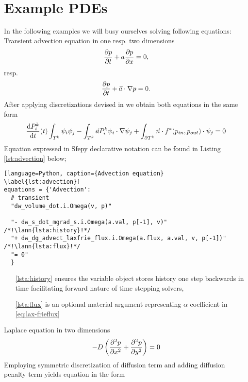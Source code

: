 \section{Example PDEs}
In the following examples we will busy ourselves solving following equations:\\
Transient advection equation in one resp. two dimensions
\begin{equation}
	\label{eq:ex_advection}
	\frac{\partial p}{\partial t} + a\frac{\partial p}{\partial x} = 0,
\end{equation}
resp.
\begin{equation}
	\frac{\partial p}{\partial t} + \vec{a}\cdot\nabla{p} = 0.
\end{equation}
After applying discretizations devised in  we obtain both equations in 
the same form
\begin{equation}
		 \frac{\text{d}P^k_i}{\text{d}t}(t)\int_{T^k}\psi_i\psi_j 
		 - \int_{T^k} \vec{a}P_i^k\psi_i\cdot\nabla\psi_j 
		 + \int_{\partial{T^k}} \vec{n}
		\cdot f^{*} (p_{in}, p_{out})\cdot\psi_j = 0
\end{equation}
Equation expressed in Sfepy declarative notation can be found in Listing 
\ref{lst:advection} below;
\setcounter{lstannotation}{0}
\begin{lstlisting}[language=Python, caption={Advection equation}
\label{lst:advection}]
equations = {'Advection': 
  # transient
  "dw_volume_dot.i.Omega(v, p)"
 
  "- dw_s_dot_mgrad_s.i.Omega(a.val, p[-1], v)" /*!\lann{lsta:history}!*/
  "+ dw_dg_advect_laxfrie_flux.i.Omega(a.flux, a.val, v, p[-1])"  /*!\lann{lsta:flux}!*/
  "= 0"
  }
\end{lstlisting}
\begin{itemize}
	\item[\ref{lsta:history}]  ensures the variable object stores 
	history one step backwards in time facilitating forward nature of time stepping 
	solvers,
	\item[\ref{lsta:flux}]  is an optional material argument 
	representing $\alpha$ coefficient in \eqref{eq:lax-frieflux}
\end{itemize}
Laplace equation in two dimensions
\begin{equation}
	\label{eq:ex_laplace}
	- D \left(\frac{\partial^2 p}{\partial x^2} + \frac{\partial^2 p}{\partial y^2} \right)= 0
\end{equation}
Employing symmetric discretization of diffusion term and adding diffusion penalty term 
yields equation in the form
